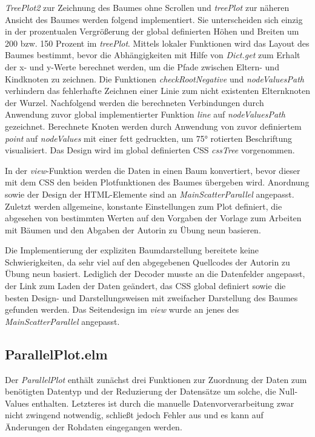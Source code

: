 \documentclass[usegeometry=true]{scrartcl}
\begin{document}
\textit{TreePlot2} zur Zeichnung des Baumes ohne Scrollen und \textit{treePlot} zur näheren Ansicht des Baumes werden folgend implementiert. 
Sie unterscheiden sich einzig in der prozentualen Vergrößerung der global definierten Höhen und Breiten um 200 bzw. 150 Prozent im \textit{treePlot}.
Mittels lokaler Funktionen wird das Layout des Baumes bestimmt, bevor die Abhängigkeiten mit Hilfe von \textit{Dict.get} 
zum Erhalt der x- und y-Werte berechnet werden, um die Pfade zwischen Eltern- und Kindknoten zu zeichnen. 
Die Funktionen \textit{checkRootNegative} und \textit{nodeValuesPath} verhindern das fehlerhafte Zeichnen einer Linie zum nicht existenten Elternknoten der Wurzel.
Nachfolgend werden die berechneten Verbindungen durch Anwendung zuvor global implementierter Funktion \textit{line} auf \textit{nodeValuesPath} gezeichnet.
Berechnete Knoten werden durch Anwendung von zuvor definiertem \textit{point} auf \textit{nodeValues} mit einer fett gedruckten, um 75° rotierten Beschriftung visualisiert. 
Das Design wird im global definierten CSS \textit{cssTree} vorgenommen. 

In der \textit{view}-Funktion werden die Daten in einen Baum konvertiert, 
bevor dieser mit dem CSS den beiden Plotfunktionen des Baumes übergeben wird.
Anordnung sowie der Design der HTML-Elemente sind an \textit{MainScatterParallel} angepasst. 
Zuletzt werden allgemeine, konstante Einstellungen zum Plot definiert, die abgesehen von bestimmten Werten
auf den Vorgaben der Vorlage zum Arbeiten mit Bäumen und den Abgaben der Autorin zu Übung neun basieren.

Die Implementierung der expliziten Baumdarstellung bereitete keine Schwierigkeiten, 
da sehr viel auf den abgegebenen Quellcodes der Autorin zu Übung neun basiert. 
Lediglich der Decoder musste an die Datenfelder angepasst, der Link zum Laden der Daten geändert, das CSS global definiert  
sowie die besten Design- und Darstellungsweisen mit zweifacher Darstellung des Baumes gefunden werden. 
Das Seitendesign im \textit{view} wurde an jenes des \textit{MainScatterParallel} angepasst. 

\subsection{ParallelPlot.elm}
Der \textit{ParallelPlot} enthält zunächst drei Funktionen zur Zuordnung der Daten zum benötigten Datentyp und der Reduzierung der Datensätze um solche, 
die Null-Values enthalten. 
Letzteres ist durch die manuelle Datenvorverarbeitung zwar nicht zwingend notwendig, 
schließt jedoch Fehler aus und es kann auf Änderungen der Rohdaten eingegangen werden. 
\end{document}
